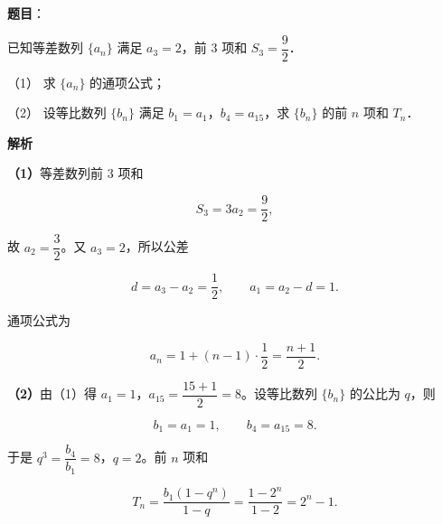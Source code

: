 \begin{answer}

\textbf{题目}：

已知等差数列 $\{a_{n}\}$ 满足 $a_{3}=2$，前 $3$ 项和 $S_{3}=\dfrac{9}{2}$．

（1） 求 $\{a_{n}\}$ 的通项公式；

（2） 设等比数列 $\{b_{n}\}$ 满足 $b_{1}=a_{1}$，$b_{4}=a_{15}$，求 $\{b_{n}\}$ 的前 $n$ 项和 $T_{n}$．

\textbf{解析}

\textbf{（1）}等差数列前 $3$ 项和

\nopagebreak[4]
\[
S_{3}=3a_{2}=\frac{9}{2},
\]

故 $a_{2}=\dfrac{3}{2}$。又 $a_{3}=2$，所以公差

\nopagebreak[4]
\[
d=a_{3}-a_{2}=\frac{1}{2},
\qquad
a_{1}=a_{2}-d=1.
\]

通项公式为

\nopagebreak[4]
\[
a_{n}=1+(n-1)\cdot\frac{1}{2}=\frac{n+1}{2}.
\]

\textbf{（2）}由（1）得 $a_{1}=1$，$a_{15}=\dfrac{15+1}{2}=8$。设等比数列 $\{b_{n}\}$ 的公比为 $q$，则

\nopagebreak[4]
\[
b_{1}=a_{1}=1,\qquad b_{4}=a_{15}=8.
\]

于是 $q^{3}=\dfrac{b_{4}}{b_{1}}=8$，$q=2$。前 $n$ 项和

\nopagebreak[4]
\[
T_{n}=\frac{b_{1}(1-q^{n})}{1-q}
=\frac{1-2^{n}}{1-2}
=2^{n}-1.
\]



\end{answer}
